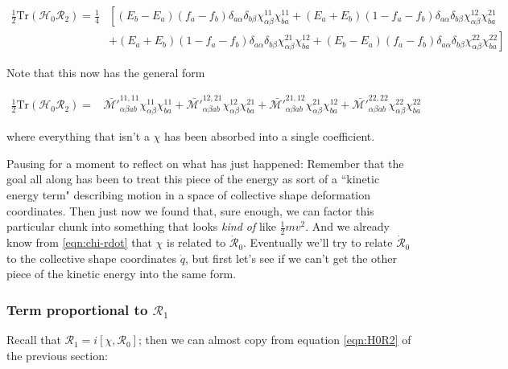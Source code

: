\begin{align}
\frac{1}{2}\mathrm{Tr}\left(\mathcal{H}_0\mathcal{R}_2\right) = \frac{1}{4}
& \left[(E_b-E_a)(f_a-f_b)\delta_{a\alpha}\delta_{b\beta}\chi^{11}_{\alpha\beta}\chi^{11}_{ba} + (E_a+E_b)(1-f_a-f_b)\delta_{a\alpha}\delta_{b\beta}\chi^{12}_{\alpha\beta}\chi^{21}_{ba}\right. \\
&\left.+ (E_a+E_b)(1-f_a-f_b)\delta_{a\alpha}\delta_{b\beta}\chi^{21}_{\alpha\beta}\chi^{12}_{ba} + (E_b-E_a)(f_a-f_b)\delta_{a\alpha}\delta_{b\beta}\chi^{22}_{\alpha\beta}\chi^{22}_{ba}\right]
\end{align}

\noindent Note that this now has the general form

\begin{tcolorbox}
	\begin{align}\label{eqn:H0R2_inertia}
	\frac{1}{2}\mathrm{Tr}\left(\mathcal{H}_0\mathcal{R}_2\right) = &
	\mathcal{\bar{M'}}^{11,11}_{\alpha\beta ab}\chi^{11}_{\alpha\beta}\chi^{11}_{ba} +
	\mathcal{\bar{M'}}^{12,21}_{\alpha\beta ab}\chi^{12}_{\alpha\beta}\chi^{21}_{ba} +
	\mathcal{\bar{M'}}^{21,12}_{\alpha\beta ab}\chi^{21}_{\alpha\beta}\chi^{12}_{ba} +
	\mathcal{\bar{M'}}^{22,22}_{\alpha\beta ab}\chi^{22}_{\alpha\beta}\chi^{22}_{ba}
	\end{align}
\end{tcolorbox}

\noindent where everything that isn't a $\chi$ has been absorbed into a single coefficient.

Pausing for a moment to reflect on what has just happened: Remember that the goal all along has been to treat this piece of the energy as sort of a ``kinetic energy term" describing motion in a space of collective shape deformation coordinates. Then just now we found that, sure enough, we can factor this particular chunk into something that looks \textit{kind of} like $\frac{1}{2}mv^2$. And we already know from \ref{eqn:chi-rdot} that $\chi$ is related to $\mathcal{\dot{R}}_0$. Eventually we'll try to relate $\mathcal{\dot{R}}_0$ to the collective shape coordinates $\dot{q}$, but first let's see if we can't get the other piece of the kinetic energy into the same form.

\subsubsection{Term proportional to $\mathcal{R}_1$}

Recall that $\mathcal{R}_1 = i\left[\chi, \mathcal{R}_0\right]$; then we can almost copy from equation \ref{eqn:H0R2} of the previous section:

